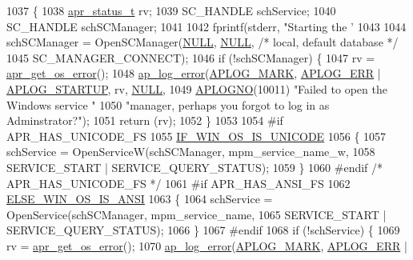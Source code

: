 \begin{DoxyCode}
1037 \{
1038     \hyperlink{group__apr__errno_gaa5105fa83cc322f09382292db8b47593}{apr\_status\_t} rv;
1039     SC\_HANDLE   schService;
1040     SC\_HANDLE   schSCManager;
1041 
1042     fprintf(stderr, \textcolor{stringliteral}{"Starting the '%
1043 
1044     schSCManager = OpenSCManager(\hyperlink{pcre_8txt_ad7f989d16aa8ca809a36bc392c07fba1}{NULL}, \hyperlink{pcre_8txt_ad7f989d16aa8ca809a36bc392c07fba1}{NULL}, \textcolor{comment}{/* local, default database */}
1045                                  SC\_MANAGER\_CONNECT);
1046     \textcolor{keywordflow}{if} (!schSCManager) \{
1047         rv = \hyperlink{group__apr__errno_gaa76e122da00af0ce2e8c8d7ff538bdfa}{apr\_get\_os\_error}();
1048         \hyperlink{group__APACHE__CORE__LOG_ga5e6676c87418af7a1d323a116c78ecb4}{ap\_log\_error}(\hyperlink{group__APACHE__CORE__LOG_ga655e126996849bcb82e4e5a14c616f4a}{APLOG\_MARK}, \hyperlink{group__APACHE__CORE__LOG_ga57ad94ed8c92c4306de90479251a5d58}{APLOG\_ERR} | 
      \hyperlink{group__APACHE__CORE__LOG_ga39efd19b052fb6f39d8f263c16cc82b7}{APLOG\_STARTUP}, rv, \hyperlink{pcre_8txt_ad7f989d16aa8ca809a36bc392c07fba1}{NULL},
1049                      \hyperlink{group__APACHE__CORE__LOG_ga1dee8a07e06bc5b3de8b89662c2cd666}{APLOGNO}(10011)  \textcolor{stringliteral}{"Failed to open the Windows service "}
1050                      \textcolor{stringliteral}{"manager, perhaps you forgot to log in as Adminstrator?"});
1051         \textcolor{keywordflow}{return} (rv);
1052     \}
1053 
1054 \textcolor{preprocessor}{#if APR\_HAS\_UNICODE\_FS}
1055     \hyperlink{win32_2apr__arch__misc_8h_a8c631486790f65bd87ed0623a25bdd3d}{IF\_WIN\_OS\_IS\_UNICODE}
1056     \{
1057         schService = OpenServiceW(schSCManager, mpm\_service\_name\_w,
1058                                   SERVICE\_START | SERVICE\_QUERY\_STATUS);
1059     \}
1060 \textcolor{preprocessor}{#endif }\textcolor{comment}{/* APR\_HAS\_UNICODE\_FS */}\textcolor{preprocessor}{}
1061 \textcolor{preprocessor}{#if APR\_HAS\_ANSI\_FS}
1062     \hyperlink{win32_2apr__arch__misc_8h_a2d1423da7a6a46da1276017c8140be22}{ELSE\_WIN\_OS\_IS\_ANSI}
1063     \{
1064         schService = OpenService(schSCManager, mpm\_service\_name,
1065                                  SERVICE\_START | SERVICE\_QUERY\_STATUS);
1066     \}
1067 \textcolor{preprocessor}{#endif}
1068     \textcolor{keywordflow}{if} (!schService) \{
1069         rv = \hyperlink{group__apr__errno_gaa76e122da00af0ce2e8c8d7ff538bdfa}{apr\_get\_os\_error}();
1070         \hyperlink{group__APACHE__CORE__LOG_ga5e6676c87418af7a1d323a116c78ecb4}{ap\_log\_error}(\hyperlink{group__APACHE__CORE__LOG_ga655e126996849bcb82e4e5a14c616f4a}{APLOG\_MARK}, \hyperlink{group__APACHE__CORE__LOG_ga57ad94ed8c92c4306de90479251a5d58}{APLOG\_ERR} | 
}
\end{DoxyCode}
